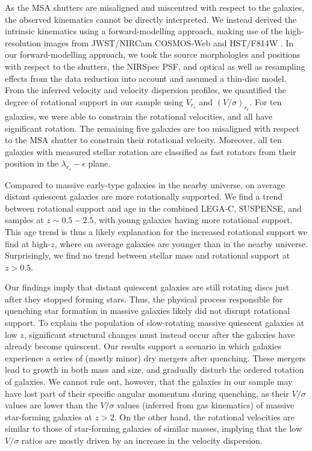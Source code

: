 \documentclass{aa}
\newcommand{\vsigma}{$(V/\sigma)_{r_e}$}
\begin{document}
As the MSA shutters are misaligned and miscentred with respect to the galaxies, the observed kinematics cannot be directly interpreted. We instead derived the intrinsic kinematics using a forward-modelling approach, making use of the high-resolution images from JWST/NIRCam COSMOS-Web \citep{CCasey2023} and HST/F814W \citep{NScoville2007}. In our forward-modelling approach, we took the source morphologies and positions with respect to the shutters, the NIRSpec PSF, and optical as well as resampling effects from the data reduction into account and assumed a thin-disc model. From the inferred velocity and velocity dispersion profiles, we quantified the degree of rotational support in our sample using $V_{r_e}$ and \vsigma. For ten galaxies, we were able to constrain the rotational velocities, and all have significant rotation. The remaining five galaxies are too misaligned with respect to the MSA shutter to constrain their rotational velocity. Moreover, all ten galaxies with measured stellar rotation are classified as fast rotators from their position in the $\lambda_{r_e}-\epsilon$ plane.

Compared to massive early-type galaxies in the nearby universe,  on average distant quiescent galaxies are more rotationally supported. We find a trend between rotational support and age in the combined LEGA-C, SUSPENSE, and \citet{ANewman2018b} samples at $z\sim0.5-2.5$, with young galaxies having more rotational support. This age trend is thus a likely explanation for the increased rotational support we find at high-$z$, where on average galaxies are younger than in the nearby universe. Surprisingly, we find no trend between stellar mass and rotational support at $z>0.5$. 

Our findings imply that distant quiescent galaxies are still rotating discs just after they stopped forming stars. Thus, the physical process responsible for quenching star formation in massive galaxies likely did not disrupt rotational support. To explain the population of slow-rotating massive quiescent galaxies at low $z$, significant structural changes must instead occur after the galaxies have already become quiescent. Our results support a scenario in which galaxies experience a series of (mostly minor) dry mergers after quenching. These mergers lead to growth in both mass and size, and gradually disturb the ordered rotation of galaxies. We cannot rule out, however, that the galaxies in our sample may have lost part of their specific angular momentum during quenching, as their $V/\sigma$ values are lower than the $V/\sigma$ values (inferred from gas kinematics) of massive star-forming galaxies at $z>2$. On the other hand, the rotational velocities are similar to those of star-forming galaxies of similar masses, implying that the low $V/\sigma$ ratios are mostly driven by an increase in the velocity dispersion.
\end{document}
